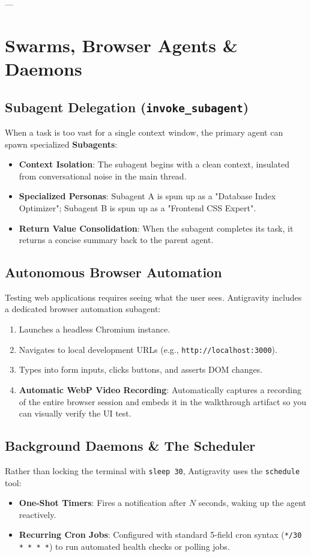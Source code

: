 \documentclass[11pt,a4paper,oneside]{book}
\begin{document}
---

\chapter{Swarms, Browser Agents \& Daemons}

\section{Subagent Delegation (\texttt{invoke\_subagent})}
When a task is too vast for a single context window, the primary agent can spawn specialized \textbf{Subagents}:

\begin{itemize}
    \item \textbf{Context Isolation}: The subagent begins with a clean context, insulated from conversational noise in the main thread.
    \item \textbf{Specialized Personas}: Subagent A is spun up as a "Database Index Optimizer"; Subagent B is spun up as a "Frontend CSS Expert".
    \item \textbf{Return Value Consolidation}: When the subagent completes its task, it returns a concise summary back to the parent agent.
\end{itemize}

\section{Autonomous Browser Automation}
Testing web applications requires seeing what the user sees. Antigravity includes a dedicated browser automation subagent:
\begin{enumerate}
    \item Launches a headless Chromium instance.
    \item Navigates to local development URLs (e.g., \texttt{http://localhost:3000}).
    \item Types into form inputs, clicks buttons, and asserts DOM changes.
    \item \textbf{Automatic WebP Video Recording}: Automatically captures a recording of the entire browser session and embeds it in the walkthrough artifact so you can visually verify the UI test.
\end{enumerate}

\section{Background Daemons \& The Scheduler}
Rather than locking the terminal with \texttt{sleep 30}, Antigravity uses the \texttt{schedule} tool:
\begin{itemize}
    \item \textbf{One-Shot Timers}: Fires a notification after $N$ seconds, waking up the agent reactively.
    \item \textbf{Recurring Cron Jobs}: Configured with standard 5-field cron syntax (\texttt{*/30 * * * *}) to run automated health checks or polling jobs.
\end{itemize}
\end{document}
